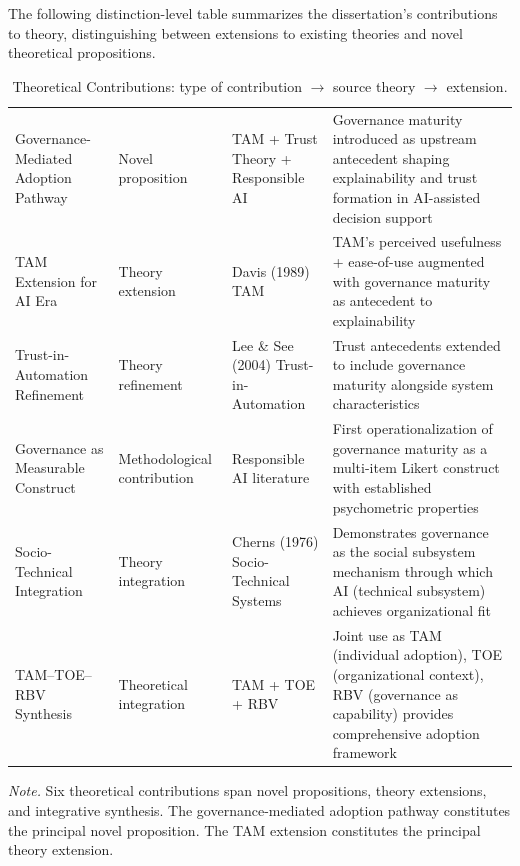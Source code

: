 \noindent The following distinction-level table summarizes the dissertation's contributions to theory, distinguishing between extensions to existing theories and novel theoretical propositions.

{\tablestripes\tablefontsize
{}
\begin{xltabular}{\textwidth}{@{} >{\raggedright\arraybackslash}p{2.8cm} >{\raggedright\arraybackslash}p{2.0cm} L L @{}}
\caption[Theoretical Contributions Table]{Theoretical Contributions: type of contribution $\rightarrow$ source theory $\rightarrow$ extension.}\label{tab:distinction_theory_contribution} \\
\toprule
{} &  &  &  \\
\midrule
\endfirsthead
\endhead
\bottomrule
\endlastfoot
Governance-Mediated Adoption Pathway & Novel proposition & TAM + Trust Theory + Responsible AI & Governance maturity introduced as upstream antecedent shaping explainability and trust formation in AI-assisted decision support \\
\addlinespace
TAM Extension for AI Era & Theory extension & Davis (1989) TAM & TAM's perceived usefulness + ease-of-use augmented with governance maturity as antecedent to explainability \\
\addlinespace
Trust-in-Automation Refinement & Theory refinement & Lee \& See (2004) Trust-in-Automation & Trust antecedents extended to include governance maturity alongside system characteristics \\
\addlinespace
Governance as Measurable Construct & Methodological contribution & Responsible AI literature & First operationalization of governance maturity as a multi-item Likert construct with established psychometric properties \\
\addlinespace
Socio-Technical Integration & Theory integration & Cherns (1976) Socio-Technical Systems & Demonstrates governance as the social subsystem mechanism through which AI (technical subsystem) achieves organizational fit \\
\addlinespace
TAM--TOE--RBV Synthesis & Theoretical integration & TAM + TOE + RBV & Joint use as TAM (individual adoption), TOE (organizational context), RBV (governance as capability) provides comprehensive adoption framework \\
\end{xltabular}}
\vspace{0.3em}\noindent\textit{Note.} Six theoretical contributions span novel propositions, theory extensions, and integrative synthesis. The governance-mediated adoption pathway constitutes the principal novel proposition. The TAM extension constitutes the principal theory extension.


